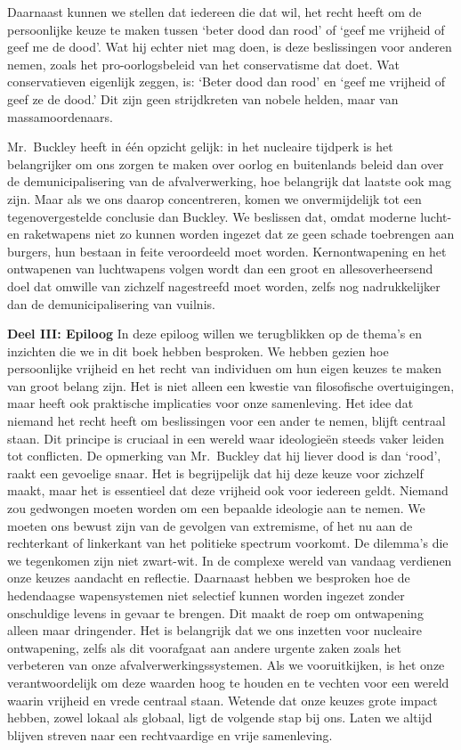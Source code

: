 \documentclass[
  a5paper,
  smalldemyvopaper,10pt,twoside,onecolumn,openright,extrafontsizes,hidelinks]{memoir}
\begin{document}
Daarnaast kunnen we stellen dat iedereen die dat wil, het recht heeft om
de persoonlijke keuze te maken tussen `beter dood dan rood' of `geef me
vrijheid of geef me de dood'. Wat hij echter niet mag doen, is deze
beslissingen voor anderen nemen, zoals het pro-oorlogsbeleid van het
conservatisme dat doet. Wat conservatieven eigenlijk zeggen, is: `Beter
dood dan rood' en `geef me vrijheid of geef ze de dood.' Dit zijn geen
strijdkreten van nobele helden, maar van massamoordenaars.

Mr.~Buckley heeft in één opzicht gelijk: in het nucleaire tijdperk is
het belangrijker om ons zorgen te maken over oorlog en buitenlands
beleid dan over de demunicipalisering van de afvalverwerking, hoe
belangrijk dat laatste ook mag zijn. Maar als we ons daarop
concentreren, komen we onvermijdelijk tot een tegenovergestelde
conclusie dan Buckley. We beslissen dat, omdat moderne lucht- en
raketwapens niet zo kunnen worden ingezet dat ze geen schade toebrengen
aan burgers, hun bestaan in feite veroordeeld moet worden.
Kernontwapening en het ontwapenen van luchtwapens volgen wordt dan een
groot en allesoverheersend doel dat omwille van zichzelf nagestreefd
moet worden, zelfs nog nadrukkelijker dan de demunicipalisering van
vuilnis.

\textbf{Deel III: Epiloog} In deze epiloog willen we terugblikken op de
thema's en inzichten die we in dit boek hebben besproken. We hebben
gezien hoe persoonlijke vrijheid en het recht van individuen om hun
eigen keuzes te maken van groot belang zijn. Het is niet alleen een
kwestie van filosofische overtuigingen, maar heeft ook praktische
implicaties voor onze samenleving. Het idee dat niemand het recht heeft
om beslissingen voor een ander te nemen, blijft centraal staan. Dit
principe is cruciaal in een wereld waar ideologieën steeds vaker leiden
tot conflicten. De opmerking van Mr.~Buckley dat hij liever dood is dan
`rood', raakt een gevoelige snaar. Het is begrijpelijk dat hij deze
keuze voor zichzelf maakt, maar het is essentieel dat deze vrijheid ook
voor iedereen geldt. Niemand zou gedwongen moeten worden om een bepaalde
ideologie aan te nemen. We moeten ons bewust zijn van de gevolgen van
extremisme, of het nu aan de rechterkant of linkerkant van het politieke
spectrum voorkomt. De dilemma's die we tegenkomen zijn niet zwart-wit.
In de complexe wereld van vandaag verdienen onze keuzes aandacht en
reflectie. Daarnaast hebben we besproken hoe de hedendaagse
wapensystemen niet selectief kunnen worden ingezet zonder onschuldige
levens in gevaar te brengen. Dit maakt de roep om ontwapening alleen
maar dringender. Het is belangrijk dat we ons inzetten voor nucleaire
ontwapening, zelfs als dit voorafgaat aan andere urgente zaken zoals het
verbeteren van onze afvalverwerkingssystemen. Als we vooruitkijken, is
het onze verantwoordelijk om deze waarden hoog te houden en te vechten
voor een wereld waarin vrijheid en vrede centraal staan. Wetende dat
onze keuzes grote impact hebben, zowel lokaal als globaal, ligt de
volgende stap bij ons. Laten we altijd blijven streven naar een
rechtvaardige en vrije samenleving.
\end{document}
